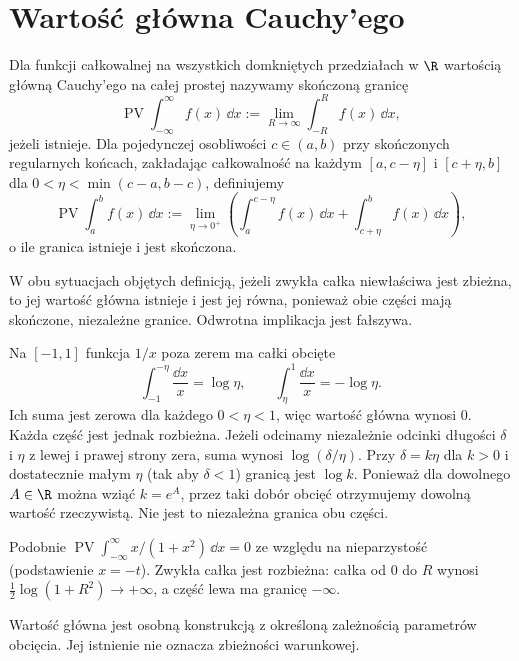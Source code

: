 \section{Wartość główna Cauchy'ego}
\begin{definicja}
\label{ma1:def:cauchy-principal-value}
Dla funkcji całkowalnej na wszystkich domkniętych przedziałach w $\R$ wartością główną Cauchy'ego na całej prostej nazywamy skończoną granicę
\[
 \operatorname{PV}\int_{-\infty}^{\infty}f(x)\,\dd x
 :=\lim_{R\to\infty}\int_{-R}^R f(x)\,\dd x,
\]
jeżeli istnieje. Dla pojedynczej osobliwości $c\in(a,b)$ przy skończonych regularnych końcach, zakładając całkowalność na każdym $[a,c-\eta]$ i $[c+\eta,b]$ dla $0<\eta<\min(c-a,b-c)$, definiujemy
\[
 \operatorname{PV}\int_a^b f(x)\,\dd x
 :=\lim_{\eta\to0^+}\left(
 \int_a^{c-\eta}f(x)\,\dd x+\int_{c+\eta}^b f(x)\,\dd x\right),
\]
o ile granica istnieje i jest skończona.
\end{definicja}
W obu sytuacjach objętych definicją, jeżeli zwykła całka niewłaściwa jest zbieżna, to jej wartość główna istnieje i jest jej równa, ponieważ obie części mają skończone, niezależne granice. Odwrotna implikacja jest fałszywa.
\begin{przyklad}
\label{ma1:ex:principal-value-counterexamples}
Na $[-1,1]$ funkcja $1/x$ poza zerem ma całki obcięte
\[
 \int_{-1}^{-\eta}\frac{\dd x}{x}=\log\eta,\qquad
 \int_\eta^1\frac{\dd x}{x}=-\log\eta.
\]
Ich suma jest zerowa dla każdego $0<\eta<1$, więc wartość główna wynosi $0$. Każda część jest jednak rozbieżna. Jeżeli odcinamy niezależnie odcinki długości $\delta$ i $\eta$ z lewej i prawej strony zera, suma wynosi $\log(\delta/\eta)$. Przy $\delta=k\eta$ dla $k>0$ i dostatecznie małym $\eta$ (tak aby $\delta<1$) granicą jest $\log k$. Ponieważ dla dowolnego $A\in\R$ można wziąć $k=e^A$, przez taki dobór obcięć otrzymujemy dowolną wartość rzeczywistą. Nie jest to niezależna granica obu części.

Podobnie $\operatorname{PV}\int_{-\infty}^{\infty}x/(1+x^2)\,\dd x=0$ ze względu na nieparzystość (podstawienie $x=-t$). Zwykła całka jest rozbieżna: całka od $0$ do $R$ wynosi $\tfrac12\log(1+R^2)\to+\infty$, a część lewa ma granicę $-\infty$.
\end{przyklad}
Wartość główna jest osobną konstrukcją z określoną zależnością parametrów obcięcia. Jej istnienie nie oznacza zbieżności warunkowej.

